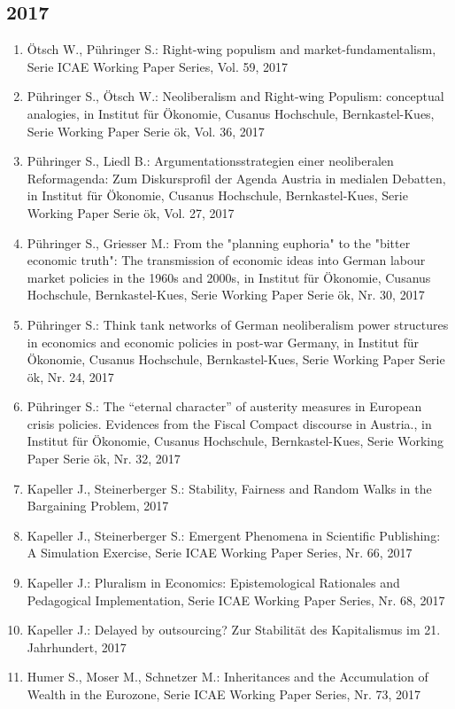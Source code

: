 \subsection*{2017}
\begin{enumerate}
    	 \item Ötsch W., Pühringer S.: Right-wing populism and market-fundamentalism, Serie ICAE Working Paper Series, Vol. 59, 2017
	 \item Pühringer S., Ötsch W.: Neoliberalism and Right-wing Populism: conceptual analogies, in Institut für Ökonomie, Cusanus Hochschule, Bernkastel-Kues, Serie Working Paper Serie ök, Vol. 36, 2017
	 \item Pühringer S., Liedl B.: Argumentationsstrategien einer neoliberalen Reformagenda: Zum Diskursprofil der Agenda Austria in medialen Debatten, in Institut für Ökonomie, Cusanus Hochschule, Bernkastel-Kues, Serie Working Paper Serie ök, Vol. 27, 2017
	 \item Pühringer S., Griesser M.: From the "planning euphoria" to the "bitter economic truth": The transmission of economic ideas into German labour market policies in the 1960s and 2000s, in Institut für Ökonomie, Cusanus Hochschule, Bernkastel-Kues, Serie Working Paper Serie ök, Nr. 30, 2017
	 \item Pühringer S.: Think tank networks of German neoliberalism power structures in economics and economic policies in post-war Germany, in Institut für Ökonomie, Cusanus Hochschule, Bernkastel-Kues, Serie Working Paper Serie ök, Nr. 24, 2017
	 \item Pühringer S.: The “eternal character” of austerity measures in European crisis policies. Evidences from the Fiscal Compact discourse in Austria., in Institut für Ökonomie, Cusanus Hochschule, Bernkastel-Kues, Serie Working Paper Serie ök, Nr. 32, 2017
	 \item Kapeller J., Steinerberger S.: Stability, Fairness and Random Walks in the Bargaining Problem, 2017
	 \item Kapeller J., Steinerberger S.: Emergent Phenomena in Scientific Publishing: A Simulation Exercise, Serie ICAE Working Paper Series, Nr. 66, 2017
	 \item Kapeller J.: Pluralism in Economics: Epistemological Rationales and Pedagogical Implementation, Serie ICAE Working Paper Series, Nr. 68, 2017
	 \item Kapeller J.: Delayed by outsourcing? Zur Stabilität des Kapitalismus im 21. Jahrhundert, 2017
	 \item Humer S., Moser M., Schnetzer M.: Inheritances and the Accumulation of Wealth in the Eurozone, Serie ICAE Working Paper Series, Nr. 73, 2017

\end{enumerate}
